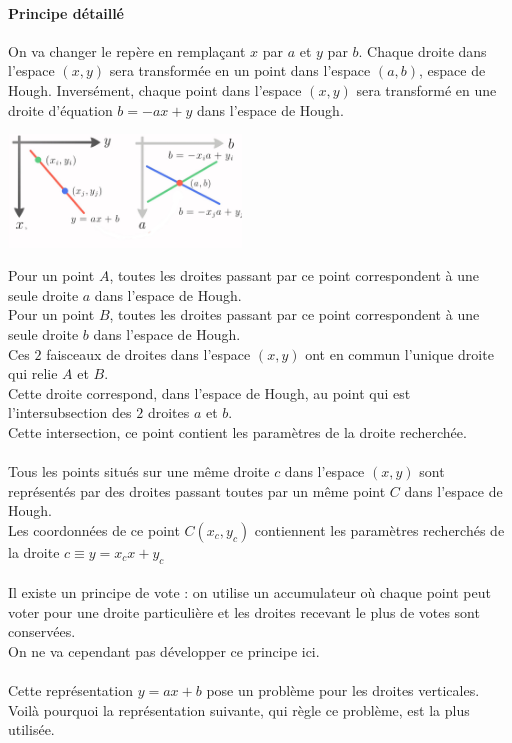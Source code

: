 \paragraph{Principe d\'etaill\'e}
On va changer le rep\`ere en rempla\c cant $x$ par $a$ et $y$ par $b$.
Chaque droite dans l'espace $(x, y)$ sera transform\'ee en un point dans l'espace $(a, b)$, espace de Hough.
Invers\'ement, chaque point dans l'espace $(x, y)$ sera transform\'e en une droite d'\'equation $b=-ax+y$ dans l'espace de Hough.
\begin{center}
\includegraphics[height=3cm]{images/hough_3.png}
\end{center}
Pour un point $A$, toutes les droites passant par ce point correspondent \`a une seule droite $a$ dans l'espace de Hough. \\
Pour un point $B$, toutes les droites passant par ce point correspondent \`a une seule droite $b$ dans l'espace de Hough. \\
Ces $2$ faisceaux de droites dans l'espace $(x, y)$ ont en commun l'unique droite qui relie $A$ et $B$. \\
Cette droite correspond, dans l'espace de Hough, au point qui est l'intersubsection des $2$ droites $a$ et $b$. \\
Cette intersection, ce point contient les param\`etres de la droite recherch\'ee. \\
 \\
Tous les points situ\'es sur une m\^eme droite $c$ dans l'espace $(x, y)$ sont repr\'esent\'es par des droites passant toutes par un m\^eme point $C$ dans l'espace de Hough. \\
Les coordonn\'ees de ce point $C(x_c, y_c)$ contiennent les param\`etres recherch\'es de la droite $c \equiv y=x_cx+y_c$ \\
 \\
Il existe un principe de vote : on utilise un accumulateur o\`u chaque point peut voter pour une droite particuli\`ere et les droites recevant le plus de votes sont conserv\'ees. \\
On ne va cependant pas d\'evelopper ce principe ici. \\
 \\
Cette repr\'esentation $y=ax+b$ pose un probl\`eme pour les droites verticales.  Voil\`a pourquoi la repr\'esentation suivante, qui r\`egle ce probl\`eme, est la plus utilis\'ee.

